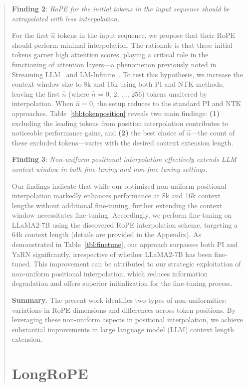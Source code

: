 \begin{abstract}
\textbf{Finding 2}: \textit{RoPE for the initial tokens in the input sequence should be extrapolated with less interpolation.} 

For the first $\hat{n}$ tokens in the input sequence, we propose that their RoPE should perform minimal interpolation. The rationale is that these initial tokens garner high attention scores, playing a critical role in the functioning of attention layers—a phenomenon previously noted in Streaming LLM~\cite{streamingllm} and LM-Infinite~\cite{han2023lminfinite}. To test this hypothesis, we increase the context window size to 8k and 16k using both PI and NTK methods, leaving the first $\hat{n}$ (where $\hat n$ = 0, 2, ..., 256) tokens unaltered by interpolation. When $\hat n = 0$, the setup reduces to the standard PI and NTK approaches. Table~\ref{tbl:tokenposition} reveals two main findings: \textbf{(1)} excluding the leading tokens from position interpolation contributes to noticeable performance gains, and \textbf{(2)} the best choice of $\hat n$—the count of these excluded tokens—varies with the desired context extension length.

\textbf{Finding 3}: \textit{Non-uniform positional interpolation effectively extends LLM context window in both fine-tuning and non-fine-tuning settings.} 

Our findings indicate that while our optimized non-uniform positional interpolation markedly enhances performance at 8k and 16k context lengths without additional fine-tuning, further extending the context window necessitates fine-tuning. Accordingly, we perform fine-tuning on LLaMA2-7B using the discovered RoPE interpolation scheme, targeting a 64k context length (details are provided in the Appendix). As demonstrated in Table~\ref{tbl:finetune}, our approach surpasses both PI and YaRN significantly, irrespective of whether LLaMA2-7B has been fine-tuned. This improvement can be attributed to our strategic exploitation of non-uniform positional interpolation, which reduces information degradation and offers superior initialization for the fine-tuning process.

\textbf{Summary}. The present work identifies two types of non-uniformities: variations in RoPE dimensions and differences across token positions. By leveraging these non-uniform aspects in positional interpolation, we achieve substantial improvements in large language model (LLM) context length extension.

\section{LongRoPE}


\end{abstract}
